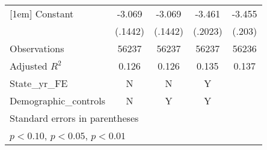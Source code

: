 \begin{table}[htbp]
\begin{tabular}{l*{4}{c}}
[1em]
Constant            &      -3.069\sym{***}&      -3.069\sym{***}&      -3.461\sym{***}&      -3.455\sym{***}\\
                    &     (.1442)         &     (.1442)         &     (.2023)         &      (.203)         \\
\hline
Observations        &       56237         &       56237         &       56237         &       56236         \\
Adjusted \(R^{2}\)  &       0.126         &       0.126         &       0.135         &       0.137         \\
State\_yr\_FE         &           N         &           N         &           Y         &                     \\
Demographic\_controls&           N         &           Y         &           Y         &                     \\
\hline\hline
\multicolumn{5}{l}{\footnotesize Standard errors in parentheses}\\
\multicolumn{5}{l}{\footnotesize \sym{*} \(p<0.10\), \sym{**} \(p<0.05\), \sym{***} \(p<0.01\)}\\
\end{tabular}
\end{table}
